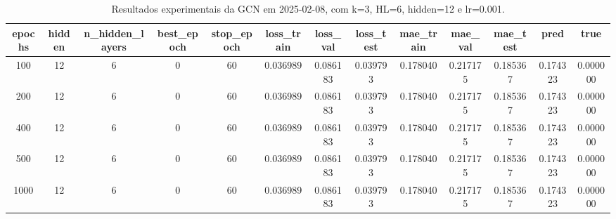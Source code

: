 \begin{table}[h]
\centering
\caption{Resultados experimentais da GCN em 2025-02-08, com k=3, HL=6, hidden=12 e lr=0.001.}
\label{tab:gcn_results_k3_hl6_h12_d20250208}
\begin{tabular}{ccccccccccccc}
\toprule
epochs & hidden & n\_hidden\_layers & best\_epoch & stop\_epoch & loss\_train & loss\_val & loss\_test & mae\_train & mae\_val & mae\_test & pred & true \\
\midrule
100 & 12 & 6 & 0 & 60 & 0.036989 & 0.086183 & 0.039793 & 0.178040 & 0.217175 & 0.185367 & 0.174323 & 0.000000 \\
200 & 12 & 6 & 0 & 60 & 0.036989 & 0.086183 & 0.039793 & 0.178040 & 0.217175 & 0.185367 & 0.174323 & 0.000000 \\
400 & 12 & 6 & 0 & 60 & 0.036989 & 0.086183 & 0.039793 & 0.178040 & 0.217175 & 0.185367 & 0.174323 & 0.000000 \\
500 & 12 & 6 & 0 & 60 & 0.036989 & 0.086183 & 0.039793 & 0.178040 & 0.217175 & 0.185367 & 0.174323 & 0.000000 \\
1000 & 12 & 6 & 0 & 60 & 0.036989 & 0.086183 & 0.039793 & 0.178040 & 0.217175 & 0.185367 & 0.174323 & 0.000000 \\
\bottomrule
\end{tabular}
\end{table}

